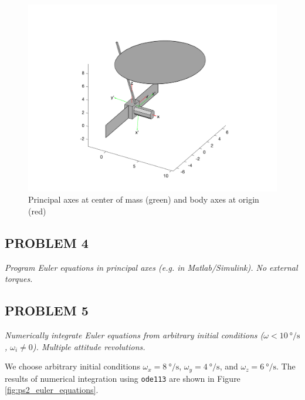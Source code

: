 \begin{figure}[H]
\centering
\includegraphics[scale=0.7]{Images/ps2_model.png}
\caption{Principal axes at center of mass (green) and body axes at origin (red)}
\label{fig:ps2_model}
\end{figure}


\subsection{PROBLEM 4}
\textit{Program Euler equations in principal axes (e.g. in Matlab/Simulink). No external torques.}




\subsection{PROBLEM 5}
\textit{Numerically integrate Euler equations from arbitrary initial conditions ($\omega<\qty{10}{\degree/\second}$, $\omega_{i}\neq0$). Multiple attitude revolutions.}

We choose arbitrary initial conditions $\omega_{x} = \qty{8}{\degree\per\second}$, $\omega_{y} = \qty{4}{\degree\per\second}$, and $\omega_{z} = \qty{6}{\degree\per\second}$. The results of numerical integration using \texttt{ode113} are shown in Figure \ref{fig:ps2_euler_equations}.

